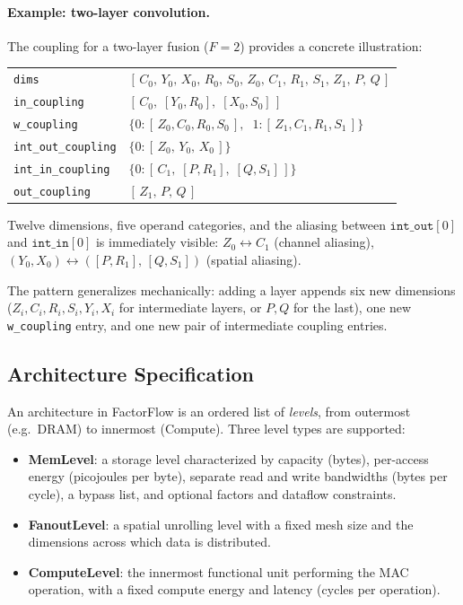 \paragraph{Example: two-layer convolution.}
The coupling for a two-layer fusion ($F = 2$) provides a concrete
illustration:

\begin{center}
\small
\begin{tabular}{@{}l@{\;:\;\;}l@{}}
  \texttt{dims}
    & $[\,C_0,\, Y_0,\, X_0,\, R_0,\, S_0,\, Z_0,\,
       C_1,\, R_1,\, S_1,\, Z_1,\, P,\, Q\,]$ \\[3pt]
  \texttt{in\_coupling}
    & $[\,C_0,\; [Y_0, R_0],\; [X_0, S_0]\,]$ \\
  \texttt{w\_coupling}
    & $\{0\!: [\,Z_0, C_0, R_0, S_0\,],
       \;\; 1\!: [\,Z_1, C_1, R_1, S_1\,]\}$ \\
  \texttt{int\_out\_coupling}
    & $\{0\!: [\,Z_0,\, Y_0,\, X_0\,]\}$ \\
  \texttt{int\_in\_coupling}
    & $\{0\!: [\,C_1,\; [P, R_1],\; [Q, S_1]\,]\}$ \\
  \texttt{out\_coupling}
    & $[\,Z_1,\, P,\, Q\,]$ \\
\end{tabular}
\end{center}

\noindent
Twelve dimensions, five operand categories, and the aliasing between
$\texttt{int\_out}[0]$ and $\texttt{int\_in}[0]$ is immediately
visible: $Z_0 \leftrightarrow C_1$ (channel aliasing),
$(Y_0, X_0) \leftrightarrow ([P, R_1],\, [Q, S_1])$ (spatial aliasing).

The pattern generalizes mechanically: adding a layer appends six new
dimensions ($Z_i, C_i, R_i, S_i, Y_i, X_i$ for intermediate layers,
or $P, Q$ for the last), one new \texttt{w\_coupling} entry, and one
new pair of intermediate coupling entries.


\subsection{Architecture Specification}
\label{sec:ps-arch-spec}

An architecture in FactorFlow is an ordered list of \emph{levels},
from outermost (e.g.\ DRAM) to innermost (Compute).
Three level types are supported:
\begin{itemize}
  \item \textbf{MemLevel}: a storage level characterized by capacity
        (bytes), per-access energy (picojoules per byte), separate read
        and write bandwidths (bytes per cycle), a bypass list, and
        optional factors and dataflow constraints.
  \item \textbf{FanoutLevel}: a spatial unrolling level with a fixed
        mesh size and the dimensions across which data is distributed.
  \item \textbf{ComputeLevel}: the innermost functional unit
        performing the MAC operation, with a fixed compute energy and
        latency (cycles per operation).
\end{itemize}


